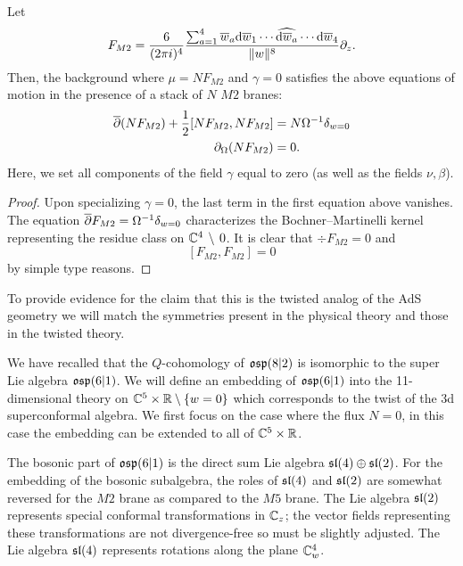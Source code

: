 \begin{lem}
Let
\[
 F_{M2} = \frac{6}{(2\pi i)^4} \frac{\sum_{a=1}^4 \overline{w}_a {\rm d} \overline{w}_1 \cdots \widehat{{\rm d} \overline{w}_a} \cdots {\rm d} \overline{w}_4}{\|w\|^{8}} \partial_z .
\]
Then, the background where $\mu = N F_{M2}$ and $\gamma = 0$
satisfies the above equations of motion in the presence of a stack of $N$ $M2$ branes:
\begin{align*}
\overline{\partial} (N F_{M2}) + \frac12 [N F_{M2}, N F_{M2}] & = N \Omega^{-1} \delta_{w=0} \\
\partial_{\Omega} (N F_{M2}) & = 0  .
\end{align*}
Here, we set all components of the field $\gamma$ equal to zero (as well as the fields $\nu,\beta$). 
\end{lem}

\begin{proof}
Upon specializing $\gamma = 0$, the last term in the first equation above vanishes. The equation $\overline{\partial} F_{M2} = \Omega^{-1} \delta_{w=0}$ characterizes the Bochner--Martinelli kernel representing the residue class on $\mathbb C^4 \, \setminus \, 0$. 
It is clear that $\div F_{M2} = 0$ and 
\[
[F_{M2}, F_{M2}] = 0
\] 
by simple type reasons. 
\end{proof}

\parsec[]

To provide evidence for the claim that this is the twisted analog of the AdS geometry we will match the symmetries present in the physical theory and those in the twisted theory. 

We have recalled that the $Q$-cohomology of $\mathfrak{osp}(8|2)$ is isomorphic to the super Lie algebra $\mathfrak{osp}(6|1)$. 
We will define an embedding of $\mathfrak{osp}(6|1)$ into the 11-dimensional theory on $\mathbb C^5 \times \mathbb R \setminus \{w=0\}$ which corresponds to the twist of the 3d superconformal algebra.
We first focus on the case where the flux $N=0$, in this case the embedding can be extended to all of $\mathbb C^5 \times \mathbb R$. 

\parsec[] 

The bosonic part of $\mathfrak{osp}(6|1)$ is the direct sum Lie algebra $\mathfrak{sl}(4) \oplus \mathfrak{sl}(2)$. 
For the embedding of the bosonic subalgebra, the roles of $\mathfrak{sl}(4)$ and $\mathfrak{sl}(2)$ are somewhat reversed for the $M2$ brane as compared to the $M5$ brane. 
The Lie algebra $\mathfrak{sl}(2)$ represents special conformal transformations in $\mathbb C_z$; the vector fields representing these transformations are not divergence-free so must be slightly adjusted. 
The Lie algebra $\mathfrak{sl}(4)$ represents rotations along the plane $\mathbb C^4_w$.   

